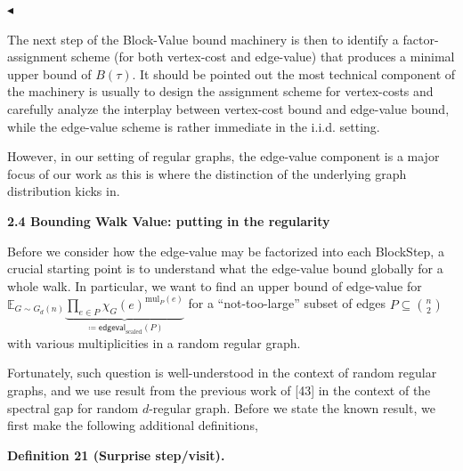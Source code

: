 \documentclass[10pt,a4paper]{article}
\begin{document}
$\blacktriangleleft$\par




The next step of the Block-Value bound machinery is then to identify a factor-assignment scheme (for both vertex-cost and edge-value) that produces a minimal upper bound of $B(\tau)$. It should be pointed out the most technical component of the machinery is usually to design the assignment scheme for vertex-costs
and carefully analyze the interplay between vertex-cost bound and edge-value bound,
while the edge-value scheme is rather immediate in the i.i.d. setting.\par




However, in our setting of regular graphs, the edge-value component is a major focus of our work as this is where the distinction of the underlying graph distribution kicks in.\par







\par\medskip\noindent\textbf{
2.4 Bounding Walk Value: putting in the regularity}\par




Before we consider how the edge-value may be factorized into each BlockStep, a crucial starting point is to understand what the edge-value bound globally for a whole walk. In particular, we want to find an upper bound of edge-value for $\mathbb{E}_{G\sim G_{d}(n)}\underbrace{\prod_{e\in P}\chi_{G}(e)^{\text{mul}_{P}(e)}}_{\coloneqq\mathsf{edgeval}_{\text{scaled}}(P)}$ for a “not-too-large” subset of edges $P\subseteq\binom{n}{2}$ with various multiplicities in a random regular graph.\par




Fortunately, such question is well-understood in the context of random regular graphs, and
we use result from the previous work of [43] in the context of the spectral gap for random $d$-regular graph. Before we state the known result, we first make the following additional definitions,\par





\par\medskip\noindent\textbf{
\textbf{Definition 21}\textbf{ }(Surprise step/visit)\textbf{.}
}\par
\end{document}
